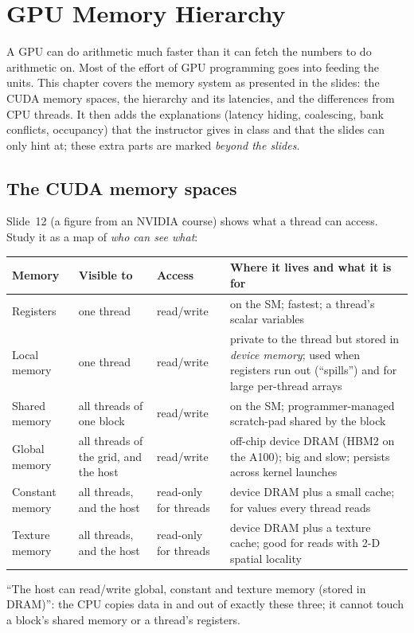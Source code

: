 \chapter{GPU Memory Hierarchy}
\label{ch:gpumem}


A GPU can do arithmetic much faster than it can fetch the numbers to do arithmetic on. Most of the effort of GPU programming goes into
feeding the units. This chapter covers the memory system as presented in the slides: the CUDA memory spaces, the hierarchy and its latencies, and the differences from CPU threads.
It then adds the explanations (latency hiding, coalescing, bank conflicts, occupancy) that the instructor gives in class and that the slides can only hint at; these
extra parts are marked \emph{beyond the slides}.

\section{The CUDA memory spaces}


Slide~12 (a figure from an NVIDIA course) shows what a thread can access. Study it as a map of \emph{who can see what}:

\begin{center}\small
\renewcommand{\arraystretch}{1.25}
\begin{tabularx}{\linewidth}{@{}l l l X@{}}
\toprule
\textbf{Memory} & \textbf{Visible to} & \textbf{Access} & \textbf{Where it lives and what it is for}\\
\midrule
Registers & one thread & read/write & on the SM; fastest; a thread's scalar variables\\
Local memory & one thread & read/write & private to the thread but stored in \emph{device memory}; used when registers run out (``spills'') and for large per-thread arrays\\
Shared memory & all threads of one block & read/write & on the SM; programmer-managed scratch-pad shared by the block\\
Global memory & all threads of the grid, and the host & read/write & off-chip device DRAM (HBM2 on the A100); big and slow; persists across kernel launches\\
Constant memory & all threads, and the host & read-only for threads & device DRAM plus a small cache; for values every thread reads\\
Texture memory & all threads, and the host & read-only for threads & device DRAM plus a texture cache; good for reads with 2-D spatial locality\\
\bottomrule
\end{tabularx}
\end{center}
``The host can read/write global, constant and texture memory (stored in DRAM)'': the CPU copies data in and out of exactly these three; it cannot touch a block's shared memory or a thread's registers.

